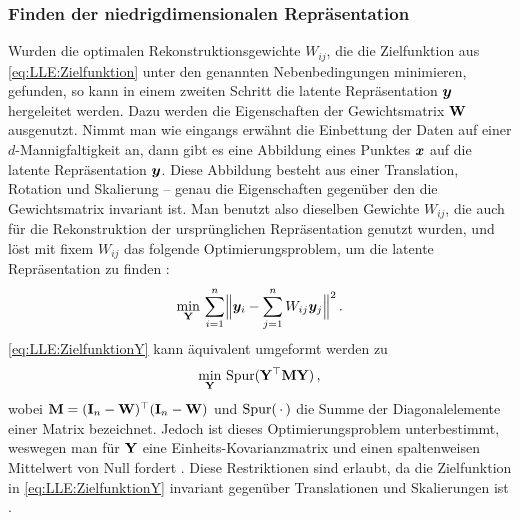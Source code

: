 \subsubsection{Finden der niedrigdimensionalen Repräsentation}
\label{ch:MethodenDerDimRed:statistisch:LLE:FindenDerRepr}
Wurden die optimalen Rekonstruktionsgewichte $W_{ij}$, die die Zielfunktion aus
\eqref{eq:LLE:Zielfunktion} unter den genannten Nebenbedingungen minimieren, gefunden, so kann in einem zweiten Schritt die latente Repräsentation $\bm{y}$ hergeleitet werden. Dazu werden die Eigenschaften der Gewichtsmatrix $\mathbf{W}$ ausgenutzt. Nimmt man wie eingangs erwähnt die Einbettung der Daten auf einer $d$-Mannigfaltigkeit an, dann gibt es eine Abbildung eines Punktes $\bm{x}$ auf die latente Repräsentation $\bm{y}$. Diese Abbildung besteht aus einer Translation, Rotation und Skalierung -- genau die Eigenschaften gegenüber den die Gewichtsmatrix invariant ist. Man benutzt also dieselben Gewichte $W_{ij}$, die auch für die Rekonstruktion der ursprünglichen Repräsentation genutzt wurden, und löst mit fixem $W_{ij}$ das folgende Optimierungsproblem, um die latente Repräsentation zu finden \parencite[2324]{Roweis.2000}:
\begin{equation}
	\label{eq:LLE:ZielfunktionY}
	\min_{\mat{Y}}\, \sum_{i = 1}^n \norm[\Big]{\vect{y}_i - \sum_{j = 1}^n W_{ij}\vect{y}_j}^2 \, .
\end{equation}
\eqref{eq:LLE:ZielfunktionY} kann äquivalent umgeformt werden zu \parencite[4]{Ghojogh.2020}
\begin{equation}
	\min_{\mathbf{Y}}\, \operatorname{Spur}(\mathbf{Y}^\top \mathbf{M} \mathbf{Y}) \, ,
\end{equation}
wobei $\mathbf{M} = (\mathbf{I}_n - \mathbf{W})^\top (\mathbf{I}_n - \mathbf{W})$ und $\operatorname{Spur}(\,\cdot\,)$ die Summe der Diagonalelemente einer Matrix bezeichnet. Jedoch ist dieses Optimierungsproblem unterbestimmt, weswegen man für $\mathbf{Y}$ eine Einheits-Kovarianzmatrix und einen spaltenweisen Mittelwert von Null fordert \parencite[11]{Saul.2000}. Diese Restriktionen sind erlaubt, da die Zielfunktion in
\eqref{eq:LLE:ZielfunktionY} invariant gegenüber Translationen und Skalierungen ist \parencite[2326]{Roweis.2000}.

